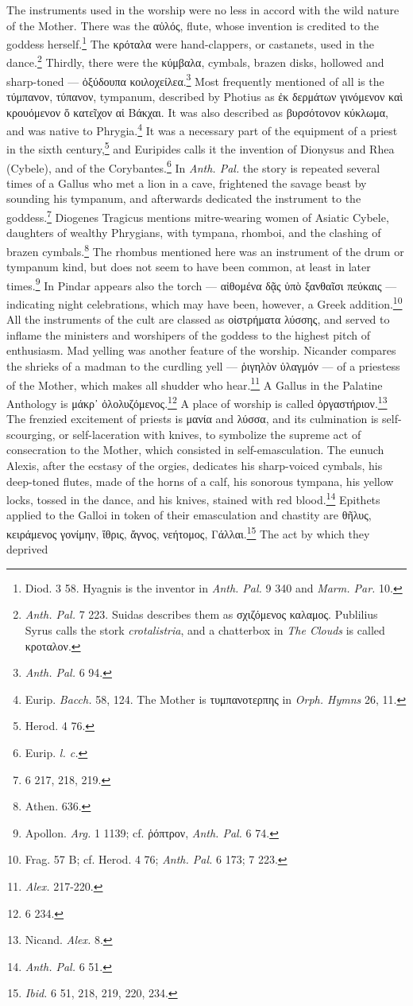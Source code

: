 \documentclass[a4paper, 11pt, oneside, polutonikogreek, french]{article}
\begin{document}
The instruments used in the worship were no less in accord with the wild nature of the Mother. There was the αὐλός, flute, whose invention is credited to the goddess herself.\footnote{Diod. 3 58. Hyagnis is the inventor in \emph{Anth. Pal.} 9 340 and \emph{Marm. Par.} 10.} The κρόταλα were hand-clappers, or castanets, used in the dance.\footnote{\emph{Anth. Pal.} 7 223. Suidas describes them as σχιζόμενος καλαμος. Publilius Syrus calls the stork \emph{crotalistria}, and a chatterbox in \emph{The Clouds} is called κροταλον.} Thirdly, there were the κύμβαλα, cymbals, brazen disks, hollowed and sharp-toned --- ὀξύδουπα κοιλοχείλεα.\footnote{\emph{Anth. Pal.} 6 94.} Most frequently mentioned of all is the τύμπανον, τύπανον, tympanum, described by Photius as ἐκ δερμάτων γινόμενον καὶ κρουόμενον ὅ κατεῖχον αἱ Βάκχαι. It was also described as βυρσότονον κύκλωμα, and was native to Phrygia.\footnote{Eurip. \emph{Bacch.} 58, 124. The Mother is τυμπανοτερπης in \emph{Orph. Hymns} 26, 11.} It was a necessary part of the equipment of a priest in the sixth century,\footnote{Herod. 4 76.} and Euripides calls it the invention of Dionysus and Rhea (Cybele), and of the Corybantes.\footnote{Eurip. \emph{l. c.}} In \emph{Anth. Pal.} the story is repeated several times of a Gallus who met a lion in a cave, frightened the savage beast by sounding his tympanum, and afterwards dedicated the instrument to the goddess.\footnote{6 217, 218, 219.} Diogenes Tragicus mentions mitre-wearing women of Asiatic Cybele, daughters of wealthy Phrygians, with tympana, rhomboi, and the clashing of brazen cymbals.\footnote{Athen. 636.} The rhombus mentioned here was an instrument of the drum or tympanum kind, but does not seem to have been common, at least in later times.\footnote{Apollon. \emph{Arg.} 1 1139; cf. ῥόπτρον, \emph{Anth. Pal.} 6 74.} In Pindar appears also the torch --- αἰθομένα δᾷς ὑπὸ ξανθαῖσι πεύκαις --- indicating night celebrations, which may have been, however, a Greek addition.\footnote{Frag. 57 B; cf. Herod. 4 76; \emph{Anth. Pal.} 6 173; 7 223.} All the instruments of the cult are classed as οἰστρήματα λύσσης, and served to inflame the ministers and worshipers of the goddess to the highest pitch of enthusiasm. Mad yelling was another feature of the worship. Nicander compares the shrieks of a madman to the curdling yell --- ῥιγηλὸν ὑλαγμόν --- of a priestess of the Mother, which makes all shudder who hear.\footnote{\emph{Alex.} 217-220.} A Gallus in the Palatine Anthology is μάκρ᾽ ὀλολυζόμενος.\footnote{6 234.} A place of worship is called ὀργαστήριον.\footnote{Nicand. \emph{Alex.} 8.} The frenzied excitement of priests is μανία and λύσσα, and its culmination is self-scourging, or self-laceration with knives, to symbolize the supreme act of consecration to the Mother, which consisted in self-emasculation. The eunuch Alexis, after the ecstasy of the orgies, dedicates his sharp-voiced cymbals, his deep-toned flutes, made of the horns of a calf, his sonorous tympana, his yellow locks, tossed in the dance, and his knives, stained with red blood.\footnote{\emph{Anth. Pal.} 6 51.} Epithets applied to the Galloi in token of their emasculation and chastity are θῆλυς, κειράμενος γονίμην, ἴθρις, ἄγνος, νεήτομος, Γάλλαι.\footnote{\emph{Ibid.} 6 51, 218, 219, 220, 234.} The act by which they deprived 
\end{document}
